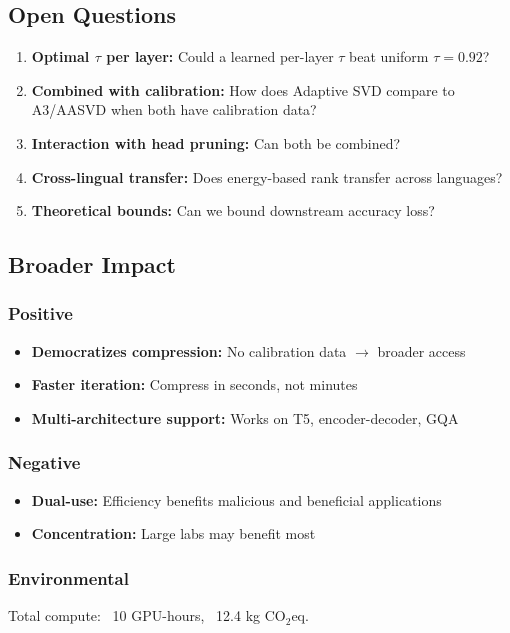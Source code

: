 \subsection{Open Questions}

\begin{enumerate}
\item \textbf{Optimal $\tau$ per layer:} Could a learned per-layer $\tau$ beat uniform
  $\tau = 0.92$?
\item \textbf{Combined with calibration:} How does Adaptive SVD compare to A3/AASVD
  when both have calibration data?
\item \textbf{Interaction with head pruning:} Can both be combined?
\item \textbf{Cross-lingual transfer:} Does energy-based rank transfer across languages?
\item \textbf{Theoretical bounds:} Can we bound downstream accuracy loss?

\end{enumerate}
\subsection{Broader Impact}

\subsubsection{Positive}
\begin{itemize}
\item \textbf{Democratizes compression:} No calibration data $\to$ broader access
\item \textbf{Faster iteration:} Compress in seconds, not minutes
\item \textbf{Multi-architecture support:} Works on T5, encoder-decoder, GQA

\end{itemize}
\subsubsection{Negative}
\begin{itemize}
\item \textbf{Dual-use:} Efficiency benefits malicious and beneficial applications
\item \textbf{Concentration:} Large labs may benefit most

\end{itemize}
\subsubsection{Environmental}
Total compute: ~10 GPU-hours, ~12.4 kg CO$_2$eq.